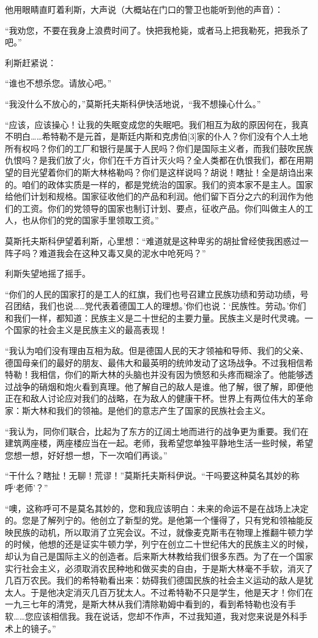 他用眼睛直盯着利斯，大声说（大概站在门口的警卫也能听到他的声音）：

“我劝您，不要在我身上浪费时间了。快把我枪毙，或者马上把我勒死，把我杀了吧。”

利斯赶紧说：

“谁也不想杀您。请放心吧。”

“我没什么不放心的，”莫斯托夫斯科伊快活地说，“我不想操心什么。”

“应该，应该操心！让我的失眠变成您的失眠吧。我们相互为敌的原因何在，我真不明白……希特勒不是元首，是斯廷内斯和克虏伯[3]家的仆人？你们没有个人土地所有权吗？你们的工厂和银行是属于人民吗？你们是国际主义者，而我们鼓吹民族仇恨吗？是我们放了火，你们在千方百计灭火吗？全人类都在仇恨我们，都在用期望的目光望着你们的斯大林格勒吗？你们是这样说吗？胡说！瞎扯！全是胡诌出来的。咱们的政体实质是一样的，都是党统治的国家。我们的资本家不是主人。国家给他们计划和规格。国家征收他们的产品和利润。他们留下百分之六的利润作为他们的工资。你们的党领导的国家也制订计划、要点，征收产品。你们叫做主人的工人，也从你们的党的国家手里领取工资。”

莫斯托夫斯科伊望着利斯，心里想：“难道就是这种卑劣的胡扯曾经使我困惑过一阵子吗？难道我会在这种又毒又臭的泥水中呛死吗？”

利斯失望地摇了摇手。

“你们的人民的国家打的是工人的红旗，我们也号召建立民族功绩和劳动功绩，号召团结，我们也说……党代表着德国工人的理想。’你们也说：‘民族性。劳动。’你们和我们一样，都知道：民族主义是二十世纪的主要力量。民族主义是时代灵魂。一个国家的社会主义是民族主义的最高表现！

“我认为咱们没有理由互相为敌。但是德国人民的天才领袖和导师、我们的父亲、德国母亲们的最好的朋友、最伟大和最英明的统帅发动了这场战争。不过我相信希特勒！我相信，你们的斯大林的头脑也并没有因为愤怒和头疼而糊涂了。他能够透过战争的硝烟和炮火看到真理。他了解自己的敌人是谁。他了解，很了解，即便他正在和敌人讨论应对我们的战略，在为敌人的健康干杯。世界上有两位伟大的革命家：斯大林和我们的领袖。是他们的意志产生了国家的民族社会主义。

“我认为，同你们联合，比起为了东方的辽阔土地而进行的战争更为重要。我们在建筑两座楼，两座楼应当在一起。老师，我希望您单独平静地生活一些时候，希望您想一想，好好想一想，下一次咱们再谈。”

“干什么？瞎扯！无聊！荒谬！”莫斯托夫斯科伊说。“干吗要这种莫名其妙的称呼‘老师’？”

“噢，这称呼可不是莫名其妙的，您和我应该明白：未来的命运不是在战场上决定的。您是了解列宁的。他创立了新型的党。是他第一个懂得了，只有党和领袖能反映民族的动机，所以取消了立宪会议。不过，就像麦克斯韦在物理上推翻牛顿力学的时候，他想的还是证实牛顿力学，列宁在创立二十世纪伟大的民族主义的时候，却认为自己是国际主义的创造者。后来斯大林教给我们很多东西。为了在一个国家实行社会主义，必须取消农民种地和做买卖的自由，于是斯大林毫不手软，消灭了几百万农民。我们的希特勒看出来：妨碍我们德国民族的社会主义运动的敌人是犹太人。于是他决定消灭几百万犹太人。不过希特勒不只是学生，他是天才！你们在一九三七年的清党，是斯大林从我们清除勒姆中看到的，看到希特勒也没有手软……您应该相信我。我在说话，您却不作声，不过我知道，我对您来说是外科手术上的镜子。”

